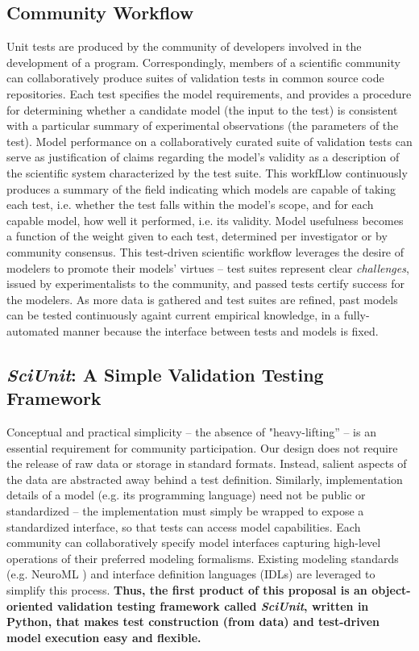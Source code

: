 \documentclass[11pt,letterpaper]{article}
\begin{document}
\subsection{Community Workflow}
Unit tests are produced by the community of developers involved in the development of a program. Correspondingly, members of a scientific community can collaboratively produce suites of validation tests in common source code repositories. Each test specifies the model requirements, and provides a procedure for determining whether a candidate model (the input to the test) is consistent with a particular summary of experimental observations (the parameters of the test). Model performance on a collaboratively curated suite of validation tests can serve as justification of claims regarding the model's validity as a description of the scientific system characterized by the test suite. This workfLlow continuously produces a summary of the field indicating which models are capable of taking each test, i.e. whether the test falls within the model's scope, and for each capable model, how well it performed, i.e. its validity.  Model usefulness becomes a function of the weight given to each test, determined per investigator or by community consensus. This test-driven scientific workflow leverages the desire of modelers to promote their models' virtues -- test suites represent clear \emph{challenges}, issued by experimentalists to the community, and passed tests certify success for the modelers. As more data is gathered and test suites are refined, past models can be tested continuously againt current empirical knowledge, in a fully-automated manner because the interface between tests and models is fixed.  

\subsection{\textit{SciUnit}: A Simple Validation Testing Framework}
Conceptual and practical simplicity -- the absence of "heavy-lifting'' -- is an essential requirement for community participation. Our design does not require the release of raw data or storage in standard formats. Instead, salient aspects of the data are abstracted away behind a test definition. Similarly, implementation details of a model (e.g. its programming language) need not be public or standardized -- the implementation must simply be wrapped to expose a standardized interface, so that tests can access model capabilities. Each community can collaboratively specify model interfaces capturing high-level operations of their preferred modeling formalisms. Existing modeling standards (e.g. NeuroML \cite{neuroml_url,gleeson_neuroml:_2010}) and interface definition languages (IDLs) \cite{bachmann2008} are leveraged to simplify this process. \textbf{Thus, the first product of this proposal is an object-oriented validation testing framework called \textit{SciUnit}, written in Python, that makes test construction (from data) and test-driven model execution easy and flexible.} 
\end{document}
